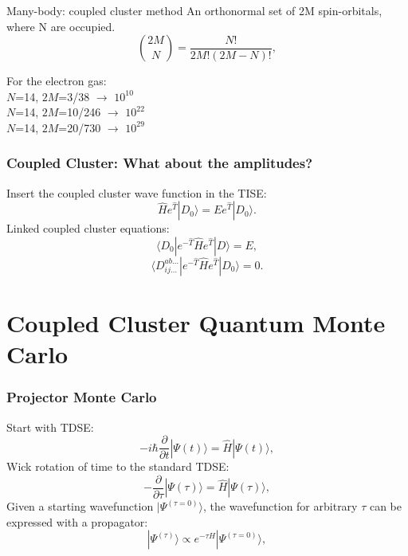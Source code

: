 \documentclass{beamer}
\begin{document}
  \begin{frame}{Many-body: coupled cluster method}
  An orthonormal set of 2M spin-orbitals, where N are occupied.
\begin{equation*}
\binom {2M}{N} = \frac{N!}{2M!(2M-N)!}, 
\end{equation*}

For the electron gas:\\

$N$=14, $2M$=3/38	$\rightarrow$ $10^{10}$\\
$N$=14, $2M$=10/246	$\rightarrow$ $10^{22}$\\
$N$=14, $2M$=20/730	$\rightarrow$ $10^{29}$

\end{frame}
\begin{frame}
\frametitle{Coupled Cluster: What about the amplitudes?}
Insert the coupled cluster wave function in the TISE:
\begin{equation*}
\hat{H}e^{\hat{T}}|D_0\rangle = Ee^{\hat{T}}|D_0\rangle.	
\end{equation*}
Linked coupled cluster equations:
\begin{equation*}
\langle D_0|e^{-\hat{T}}\hat{H}e^{\hat{T}}|D\rangle = E,
\end{equation*}
\begin{equation*}
\langle D_{ij\dots}^{ab\dots}|e^{-\hat{T}}\hat{H}e^{\hat{T}}|D_0 \rangle = 0.
\end{equation*}

\end{frame}


\section{Coupled Cluster Quantum Monte Carlo}
\begin{frame}
\frametitle{Projector Monte Carlo}
Start with TDSE:
\begin{equation*}
-i\hbar \frac{\partial}{\partial t} |\Psi(t)\rangle= \hat{H} |\Psi(t)\rangle,
\end{equation*}
Wick rotation of time to the standard TDSE:
\begin{equation*}
-\frac{\partial}{\partial \tau} |\Psi(\tau)\rangle= \hat{H} |\Psi(\tau)\rangle,
\end{equation*}
Given a starting wavefunction $|\Psi^{(\tau = 0)}\rangle$, the wavefunction for arbitrary $\tau$ can be expressed with a propagator:
\begin{equation*}
|\Psi^{(\tau)}\rangle \propto e^{-\tau \hat{H}}|\Psi^{(\tau = 0)}\rangle,
\end{equation*}
\end{frame}
\end{document}
